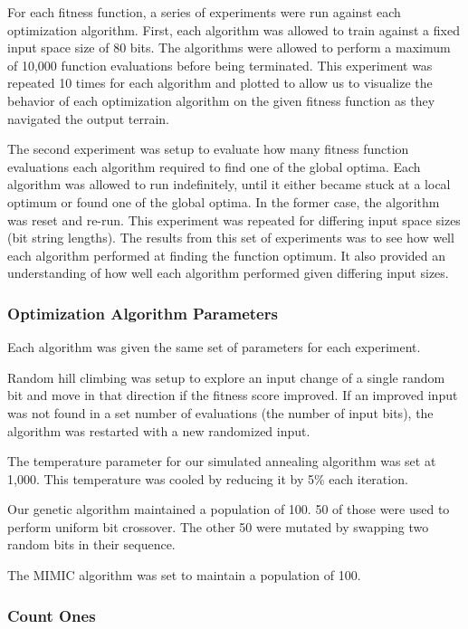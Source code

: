 \documentclass{sig-alternate}
\begin{document}
For each fitness function, a series of experiments were run against each optimization algorithm. First, each algorithm was allowed to train against a fixed input space size of 80 bits. The algorithms were allowed to perform a maximum of 10,000 function evaluations before being terminated. This experiment was repeated 10 times for each algorithm and plotted to allow us to visualize the behavior of each optimization algorithm on the given fitness function as they navigated the output terrain.

The second experiment was setup to evaluate how many fitness function evaluations each algorithm required to find one of the global optima. Each algorithm was allowed to run indefinitely, until it either became stuck at a local optimum or found one of the global optima. In the former case, the algorithm was reset and re-run. This experiment was repeated for differing input space sizes (bit string lengths). The results from this set of experiments was to see how well each algorithm performed at finding the function optimum. It also provided an understanding of how well each algorithm performed given differing input sizes.

\subsubsection{Optimization Algorithm Parameters}

Each algorithm was given the same set of parameters for each experiment. 

Random hill climbing was setup to explore an input change of a single random bit and move in that direction if the fitness score improved. If an improved input was not found in a set number of evaluations (the number of input bits), the algorithm was restarted with a new randomized input.

The temperature parameter for our simulated annealing algorithm was set at 1,000. This temperature was cooled by reducing it by 5\% each iteration. 

Our genetic algorithm maintained a population of 100. 50 of those were used to perform uniform bit crossover. The other 50 were mutated by swapping two random bits in their sequence.

The MIMIC algorithm was set to maintain a population of 100.


\subsubsection{Count Ones}
\end{document}
